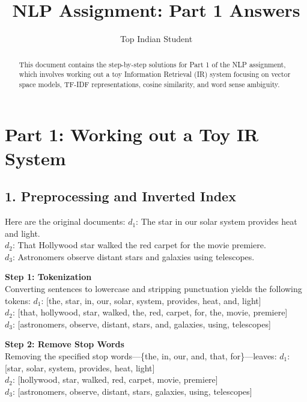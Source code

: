 \documentclass{svproc}
\begin{document}
\mainmatter 

\title{NLP Assignment: Part 1 Answers}
\author{Top Indian Student}

\maketitle 

\begin{abstract}
This document contains the step-by-step solutions for Part 1 of the NLP assignment, which involves working out a toy Information Retrieval (IR) system focusing on vector space models, TF-IDF representations, cosine similarity, and word sense ambiguity.
\end{abstract}

\section*{Part 1: Working out a Toy IR System}

\subsection*{1. Preprocessing and Inverted Index}
Here are the original documents:
$d_1$: The star in our solar system provides heat and light. \\
$d_2$: That Hollywood star walked the red carpet for the movie premiere. \\
$d_3$: Astronomers observe distant stars and galaxies using telescopes.

\textbf{Step 1: Tokenization} \\
Converting sentences to lowercase and stripping punctuation yields the following tokens:
$d_1$: [the, star, in, our, solar, system, provides, heat, and, light] \\
$d_2$: [that, hollywood, star, walked, the, red, carpet, for, the, movie, premiere] \\
$d_3$: [astronomers, observe, distant, stars, and, galaxies, using, telescopes]

\textbf{Step 2: Remove Stop Words} \\
Removing the specified stop words—\{the, in, our, and, that, for\}—leaves:
$d_1$: [star, solar, system, provides, heat, light] \\
$d_2$: [hollywood, star, walked, red, carpet, movie, premiere] \\
$d_3$: [astronomers, observe, distant, stars, galaxies, using, telescopes]
\end{document}
